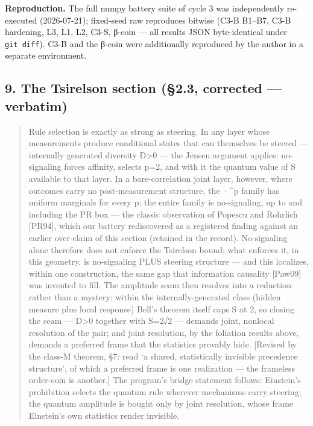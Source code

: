 \documentclass[
  11pt]{article}
\begin{document}
\textbf{Reproduction.} The full numpy battery suite of cycle 3 was
independently re-executed (2026-07-21); fixed-seed raw reproduces
bitwise (C3-B B1--B7, C3-B hardening, L3, L1, L2, C3-S, β-coin --- all
results JSON byte-identical under \texttt{git\ diff}). C3-B and the
β-coin were additionally reproduced by the author in a separate
environment.

\subsection{9. The Tsirelson section (§2.3, corrected ---
verbatim)}\label{the-tsirelson-section-2.3-corrected-verbatim}

\begin{quote}
Rule selection is exactly as strong as steering. In any layer whose
measurements produce conditional states that can themselves be steered
--- internally generated diversity D\textgreater0 --- the Jensen
argument applies: no-signaling forces affinity, selects p=2, and with it
the quantum value of S available to that layer. In a bare-correlation
joint layer, however, where outcomes carry no post-measurement
structure, the \textbar·\textbar\^{}p family has uniform marginals for
every p: the entire family is no-signaling, up to and including the PR
box --- the classic observation of Popescu and Rohrlich {[}PR94{]},
which our battery rediscovered as a registered finding against an
earlier over-claim of this section (retained in the record).
No-signaling alone therefore does not enforce the Tsirelson bound; what
enforces it, in this geometry, is no-signaling PLUS steering structure
--- and this localizes, within one construction, the same gap that
information causality {[}Paw09{]} was invented to fill. The amplitude
seam then resolves into a reduction rather than a mystery: within the
internally-generated class (hidden measure plus local response) Bell's
theorem itself caps S at 2, so closing the seam --- D\textgreater0
together with S=2√2 --- demands joint, nonlocal resolution of the pair;
and joint resolution, by the foliation results above, demands a
preferred frame that the statistics provably hide. {[}Revised by the
class-M theorem, §7: read `a shared, statistically invisible precedence
structure', of which a preferred frame is one realization --- the
frameless order-coin is another.{]} The program's bridge statement
follows: Einstein's prohibition selects the quantum rule wherever
mechanisms carry steering; the quantum amplitude is bought only by joint
resolution, whose frame Einstein's own statistics render invisible.
\end{quote}
\end{document}

